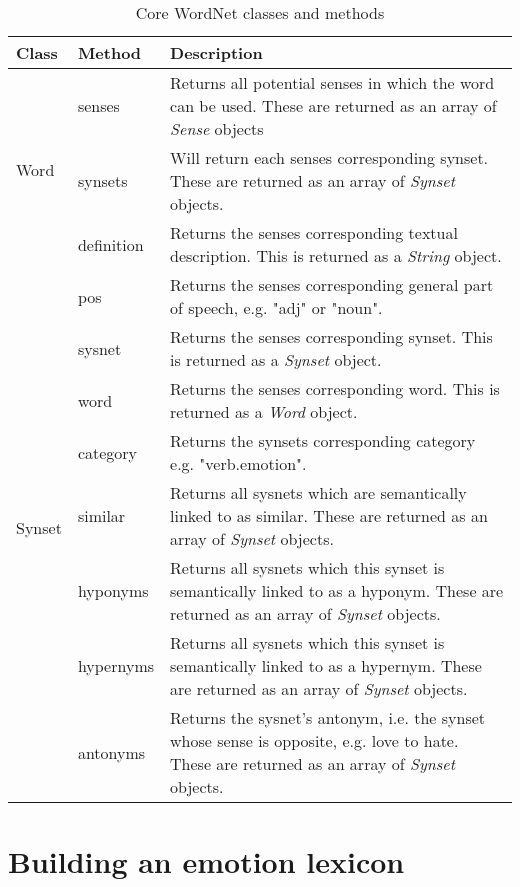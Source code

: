 \begin{longtable}{|l|l|p{3in}|}
	\caption{Core WordNet classes and methods} \label{table:wordnet} \\
	\hline
	Class & Method & Description \\
	\hline
	\multirow{3}{*}{Word}	& senses			& Returns all potential senses in which the word can be used. These are returned as an array of \emph{Sense} objects\\
												\cline{2-3}
												& synsets			& Will return each senses corresponding synset. These are returned as an array of \emph{Synset} objects.\\
	\hline
	\multirow{3}{*}{Sense}	& definition	& Returns the senses corresponding textual description. This is returned as a \emph{String} object. \\
													\cline{2-3}
													& pos					& Returns the senses corresponding general part of speech, e.g. "adj" or "noun". \\
													\cline{2-3}
													& sysnet			& Returns the senses corresponding synset. This is returned as a \emph{Synset} object. \\
													& word				& Returns the senses corresponding word. This is returned as a \emph{Word} object. \\
	\hline
	\multirow{3}{*}{Synset}	& category		& Returns the synsets corresponding category e.g. "verb.emotion". \\
													\cline{2-3}
													& similar			& Returns all sysnets which are semantically linked to as similar. These are returned as an array of \emph{Synset} objects. \\
													\cline{2-3}
													& hyponyms		& Returns all sysnets which this synset is semantically linked to as a hyponym. These are returned as an array of \emph{Synset} objects. \\
													\cline{2-3}
													& hypernyms		& Returns all sysnets which this synset is semantically linked to as a hypernym. These are returned as an array of \emph{Synset} objects. \\
													& antonyms		& Returns the sysnet's antonym, i.e. the synset whose sense is opposite, e.g. love to hate. These are returned as an array of \emph{Synset} objects. \\
	\hline
	
\end{longtable}

\section{Building an emotion lexicon}

